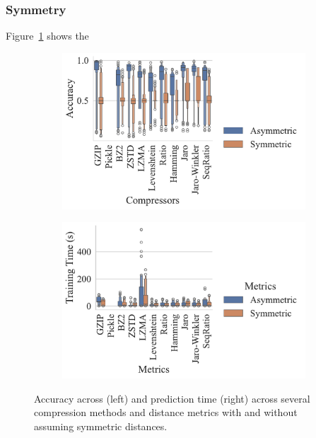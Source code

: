 \subsubsection{Symmetry}

Figure~\ref{fig:sms_spam_symmetry} shows the 

\begin{figure}[h!]
    \centering
    \captionsetup[subfigure]{skip=0pt}
    \begin{subfigure}[t]{.44\textwidth}
        \centering
        \includegraphics[width=\textwidth]{figs/sms_spam/symmetric_vs_metric.pdf}
    \end{subfigure}
    \begin{subfigure}[t]{.44\textwidth}
        \centering
        \includegraphics[width=\textwidth]{figs/sms_spam/symmetric_vs_metric_train_time.pdf}
    \end{subfigure}
    \caption{Accuracy across (left) and prediction time (right) across several compression methods and distance metrics with and without assuming symmetric distances.}
    \label{fig:sms_spam_symmetry}
\end{figure}